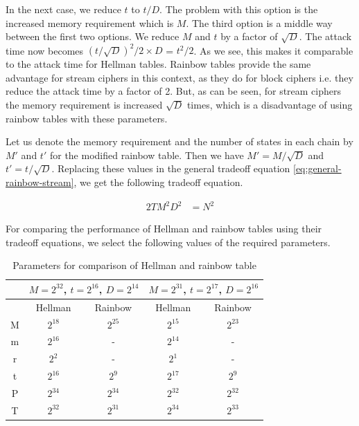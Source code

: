 In the next case, we reduce $t$ to $t/D$. The problem with this option is the increased memory requirement which is $M$. The third option is a middle way between the first two options. We reduce $M$ and $t$ by a factor of $\sqrt{D}$. The attack time now becomes ${(t/\sqrt{D})}^2/2 \times D$ = $t^2/2$. As we see, this makes it comparable to the attack time for Hellman tables. Rainbow tables provide the same advantage for stream ciphers in this context, as they do for block ciphers i.e. they reduce the attack time by a factor of 2. But, as can be seen, for stream ciphers the memory requirement is increased $\sqrt{D}$ times, which is a disadvantage of using rainbow tables with these parameters.

Let us denote the memory requirement and the number of states in each chain by $M'$ and $t'$ for the modified rainbow table. Then we have $M' = M/\sqrt{D}$ and $t' = t/\sqrt{D}$. Replacing these values in the general tradeoff equation \ref{eq:general-rainbow-stream}, we get the following tradeoff equation.

\begin{align}
\label{eq:tmdto-rainbow-stream} 2TM^2D^2 &= N^2
\end{align}

For comparing the performance of Hellman and rainbow tables using their tradeoff equations, we select the following values of the required parameters. 

\begin{table}[ht!]
\begin{center}
\begin{tabular}{|c|c c||c c|}
\hline
			& \multicolumn{2}{c||}{$M = 2^{32}$, $t = 2^{16}$, $D = 2^{14}$} 	& \multicolumn{2}{c|}{$M = 2^{31}$, $t = 2^{17}$, $D = 2^{16}$}	\\ \hline \hline
			&	Hellman				&	Rainbow					&	Hellman					& Rainbow				\\ \hline \hline
M			&	$2^{18}$			&	$2^{25}$				&	$2^{15}$				& $2^{23}$			\\ \hline 
m			&	$2^{16}$			&		-							&	$2^{14}$				& 	-						\\ \hline 
r			&	$2^{2}$				&		-							&	$2^{1}$					& 	-						\\ \hline 
t			&	$2^{16}$			&	$2^{9}$					&	$2^{17}$				& $2^{9}$				\\ \hline 
P			&	$2^{34}$			&	$2^{34}$				&	$2^{32}$				& $2^{32}$			\\ \hline 
T			&	$2^{32}$			&	$2^{31}$				&	$2^{34}$				& $2^{33}$			\\ \hline 
\end{tabular}
\end{center} 
\caption{Parameters for comparison of Hellman and rainbow table}
\label{tab:parameters-comparison}
\end{table}